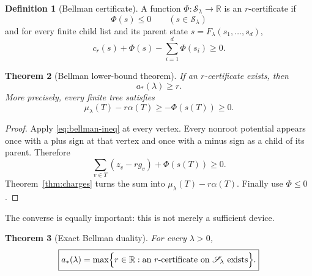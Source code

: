 \documentclass[11pt,a4paper]{article}
\newtheorem{theorem}{Theorem}
\theoremstyle{definition}
\newtheorem{definition}[theorem]{Definition}
\theoremstyle{remark}
\newcommand{\Sset}{\mathscr S}
\newcommand{\1}{\mathbf 1}
\begin{document}
\begin{definition}[Bellman certificate]
A function $\Phi:\Sset_\lambda\to\mathbb R$ is an $r$-certificate if
\begin{equation}
  \Phi(s)\le0
  \qquad(s\in\Sset_\lambda)
  \label{eq:nonpositive}
\end{equation}
and for every finite child list and its parent state
$s=F_\lambda(s_1,\dots,s_d)$,
\begin{equation}
  c_r(s)+\Phi(s)-\sum_{i=1}^d\Phi(s_i)\ge0.
  \label{eq:bellman-ineq}
\end{equation}
\end{definition}

\begin{theorem}[Bellman lower-bound theorem]
\label{thm:bellman-lb}
If an $r$-certificate exists, then
\[
  a_*(\lambda)\ge r.
\]
More precisely, every finite tree satisfies
\[
  \mu_\lambda(T)-r\alpha(T)\ge-\Phi(s(T))\ge0.
\]
\end{theorem}

\begin{proof}
Apply \eqref{eq:bellman-ineq} at every vertex.  Every nonroot potential appears once
with a plus sign at that vertex and once with a minus sign as a child of its parent.
Therefore
\[
  \sum_{v\in T}\left(z_v-rg_v\right)+\Phi(s(T))\ge0.
\]
Theorem~\ref{thm:charges} turns the sum into
$\mu_\lambda(T)-r\alpha(T)$.  Finally use $\Phi\le0$.
\end{proof}

The converse is equally important: this is not merely a sufficient device.

\begin{theorem}[Exact Bellman duality]
\label{thm:bellman-duality}
For every $\lambda>0$,
\begin{equation}
  \boxed{
  a_*(\lambda)
  =\max\Bigl\{r\in\mathbb R:
  \text{an $r$-certificate on $\Sset_\lambda$ exists}\Bigr\}.}
  \label{eq:dual-characterization}
\end{equation}
\end{theorem}
\end{document}
